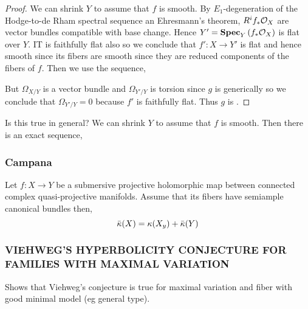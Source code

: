 \documentclass[12pt]{article}
\begin{document}
\begin{proof}
We can shrink $Y$ to assume that $f$ is smooth. By $E_1$-degeneration of the Hodge-to-de Rham spectral sequence an Ehresmann's theorem, $R^i f_* \mathcal{O}_{X}$ are vector bundles compatible with base change. Hence $Y' = \mathbf{Spec}_{Y}\left( f_* \mathcal{O}_{X} \right)$ is flat over $Y$. IT is faithfully flat also so we conclude that $f' : X \to Y'$ is flat and hence smooth since its fibers are smooth since they are reduced components of the fibers of $f$. Then we use the sequence, 
\begin{center}
\end{center}
But $\Omega_{X/Y}$ is a vector bundle and $\Omega_{Y'/Y}$ is torsion since $g$ is generically \etale so we conclude that $\Omega_{Y'/Y} = 0$ because $f'$ is faithfully flat. Thus $g$ is \etale. 
\end{proof}


Is this true in general? We can shrink $Y$ to assume that $f$ is smooth. Then there is an exact sequence,
\begin{center}
\end{center}

\subsubsection{Campana}

\begin{theorem}
Let $f : X \to Y$ be a submersive projective holomorphic map between connected complex quasi-projective manifolds. Assume that its fibers have semiample canonical bundles then,
\[ \bar{\kappa}(X) = \kappa(X_y) + \bar{\kappa}(Y) \]
\end{theorem}


\subsubsection{VIEHWEG’S HYPERBOLICITY CONJECTURE FOR FAMILIES
WITH MAXIMAL VARIATION}

Shows that Viehweg's conjecture is true for maximal variation and fiber with good minimal model (eg general type). 
\end{document}
